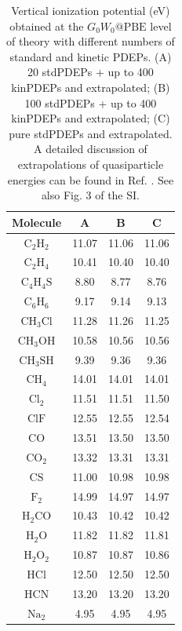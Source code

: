 \documentclass[aip,preprint]{revtex4-1}
\begin{document}
\begin{table}
    \centering
    \caption{Vertical ionization potential (eV) obtained at the $G_0W_0@\mathrm{PBE}$ level of theory with different numbers of standard and kinetic PDEPs. (A) 20 stdPDEPs + up to 400 kinPDEPs and extrapolated; (B) 100 stdPDEPs  + up to 400 kinPDEPs and extrapolated; (C) pure stdPDEPs and extrapolated. A detailed discussion of extrapolations of quasiparticle energies can be found in Ref. . See also  Fig. 3 of the SI.\label{tab:VIP-PBE-small}}
    \begin{tabular}{cccc}
    \hline\hline
    Molecule & A & B & C \\
    \hline
  $\mathrm{C_2H_2}$ &  11.07 &  11.06 &  11.06 \\
  $\mathrm{C_2H_4}$ &  10.41 &  10.40 &  10.40 \\
 $\mathrm{C_4H_4S}$ &   8.80 &   8.77 &   8.76 \\
  $\mathrm{C_6H_6}$ &   9.17 &   9.14 &   9.13 \\
 $\mathrm{CH_3Cl}$  &  11.28 &  11.26 &  11.25 \\
 $\mathrm{CH_3OH}$  &  10.58 &  10.56 &  10.56 \\
 $\mathrm{CH_3SH}$  &   9.39 &   9.36 &   9.36 \\
   $\mathrm{CH_4}$  &  14.01 &  14.01 &  14.01 \\
   $\mathrm{Cl_2}$  &  11.51 &  11.51 &  11.50 \\
   $\mathrm{ClF}$   &  12.55 &  12.55 &  12.54 \\
    $\mathrm{CO}$   &  13.51 &  13.50 &  13.50 \\
   $\mathrm{CO_2}$  &  13.32 &  13.31 &  13.31 \\
    $\mathrm{CS}$   &  11.00 &  10.98 &  10.98 \\
    $\mathrm{F_2}$  &  14.99 &  14.97 &  14.97 \\
  $\mathrm{H_2CO}$  &  10.43 &  10.42 &  10.42 \\
   $\mathrm{H_2O}$  &  11.82 &  11.82 &  11.81 \\
  $\mathrm{H_2O_2}$ &  10.87 &  10.87 &  10.86 \\
   $\mathrm{HCl}$   &  12.50 &  12.50 &  12.50 \\
   $\mathrm{HCN}$   &  13.20 &  13.20 &  13.20 \\
   $\mathrm{Na_2}$  &   4.95 &   4.95 &   4.95 \\
   \hline\hline
    \end{tabular}
\end{table}
\end{document}

